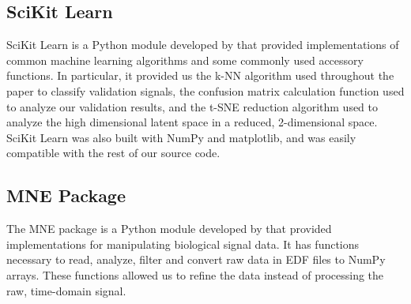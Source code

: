 \subsection*{SciKit Learn}
SciKit Learn is a Python module developed by \citet{sklearn} that provided implementations of common machine learning algorithms and some commonly used accessory functions. In particular, it provided us the k-NN algorithm used throughout the paper to classify validation signals, the confusion matrix calculation function used to analyze our validation results, and the t-SNE reduction algorithm used to analyze the high dimensional latent space in a reduced, 2-dimensional space. SciKit Learn was also built with NumPy and matplotlib, and was easily compatible with the rest of our source code. 

\subsection*{MNE Package}

The MNE package is a Python module developed by \citet{mne} that provided implementations for manipulating biological signal data. It has functions necessary to read, analyze, filter and convert raw data in EDF files to NumPy arrays. These functions allowed us to refine the data instead of processing the raw, time-domain signal.